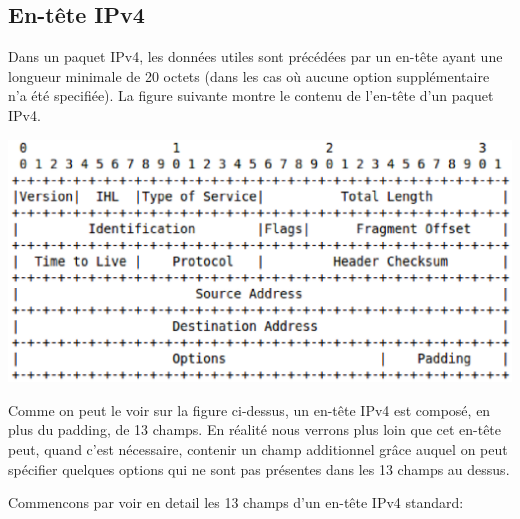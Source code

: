 
\subsection{En-tête IPv4}
Dans un paquet IPv4, les données utiles sont précédées par un en-tête ayant une longueur minimale de 20 octets 
(dans les cas où aucune option supplémentaire n'a été specifiée).
La figure suivante montre le contenu de l'en-tête d'un paquet IPv4.


\includegraphics[width=15cm]{./pics/IPv4header.eps}


Comme on peut le voir sur la figure ci-dessus, un en-tête IPv4 est composé, en plus du padding, de
13 champs. En réalité nous verrons plus loin que cet en-tête
peut, quand c'est nécessaire, contenir un champ additionnel grâce auquel
on peut spécifier quelques options qui ne sont pas présentes dans les 13 champs
au dessus.


Commencons par voir en detail les 13 champs d'un en-tête IPv4 standard:

